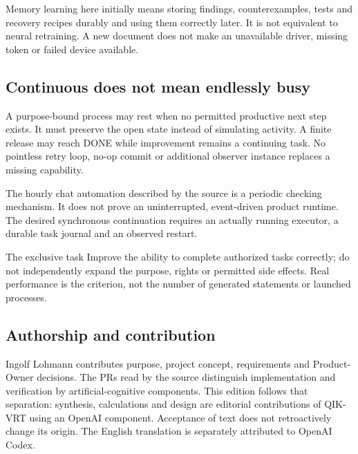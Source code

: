 \begin{cols}
Memory learning here initially means storing findings, counterexamples, tests and recovery recipes durably and using them correctly later. It is not equivalent to neural retraining. A new document does not make an unavailable driver, missing token or failed device available.

\subsection*{Continuous does not mean endlessly busy}
A purpose-bound process may rest when no permitted productive next step exists. It must preserve the open state instead of simulating activity. A finite release may reach DONE while improvement remains a continuing task. No pointless retry loop, no-op commit or additional observer instance replaces a missing capability. 

The hourly chat automation described by the source is a periodic checking mechanism. It does not prove an uninterrupted, event-driven product runtime. The desired synchronous continuation requires an actually running executor, a durable task journal and an observed restart.

\begin{boundary}{The exclusive task}
Improve the ability to complete authorized tasks correctly; do not independently expand the purpose, rights or permitted side effects. Real performance is the criterion, not the number of generated statements or launched processes.
\end{boundary}

\subsection*{Authorship and contribution}
Ingolf Lohmann contributes purpose, project concept, requirements and Product-Owner decisions. The PRs read by the source distinguish implementation and verification by artificial-cognitive components. This edition follows that separation: synthesis, calculations and design are editorial contributions of QIK-VRT using an OpenAI component. Acceptance of text does not retroactively change its origin. The English translation is separately attributed to OpenAI Codex. 
\end{cols}

